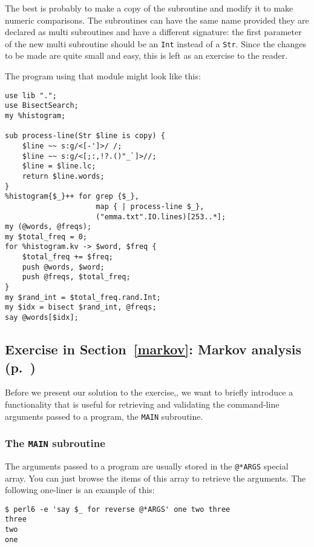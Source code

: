 The best is probably to make a copy of the subroutine and modify it 
to make numeric comparisons. The subroutines can have the same 
name provided they are declared as multi subroutines and have 
a different signature: the first parameter of the new multi 
subroutine should be an {\tt Int} instead of a {\tt Str}. Since 
the changes to be made are quite small and easy, this is 
left as an exercise to the reader.

The program using that module might look like this:

\begin{verbatim}
use lib ".";
use BisectSearch;
my %histogram;

sub process-line(Str $line is copy) {
    $line ~~ s:g/<[-']>/ /; 
    $line ~~ s:g/<[;:,!?.()"_`]>//; 
    $line = $line.lc; 
    return $line.words;
}
%histogram{$_}++ for grep {$_},
                     map { | process-line $_}, 
                     ("emma.txt".IO.lines)[253..*]; 
my (@words, @freqs);
my $total_freq = 0;
for %histogram.kv -> $word, $freq {
    $total_freq += $freq;
    push @words, $word;
    push @freqs, $total_freq;
}
my $rand_int = $total_freq.rand.Int;
my $idx = bisect $rand_int, @freqs;
say @words[$idx];
\end{verbatim}

\subsection{Exercise in Section~\ref{markov}: Markov analysis (p.~\pageref{markov_analysis})}
\label{sol_markov_analysis}

Before we present our solution to the exercise,, we want 
to briefly introduce a functionality that is useful for 
retrieving and validating the command-line arguments passed 
to a program, the {\tt MAIN} subroutine.

\subsubsection{The {\tt MAIN} subroutine}
\label{MAIN_sub}

The arguments passed to a program are usually stored in the 
\verb'@*ARGS' special array. You can just browse the items of this 
array to retrieve the arguments. The following one-liner is 
an example of this:

\begin{verbatim}
$ perl6 -e 'say $_ for reverse @*ARGS' one two three
three
two
one
\end{verbatim}

